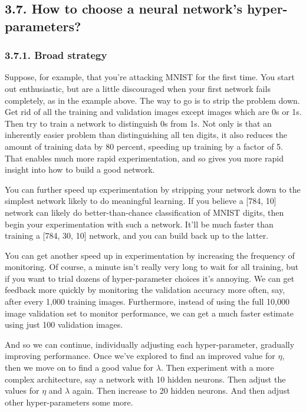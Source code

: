 \documentclass[12 pt]{article}
\begin{document}
\subsection{3.7. How to choose a neural network's hyper-parameters?}
\label{how-to-choose-a-neural-networks-hyper-parameters}

\subsubsection{3.7.1. Broad strategy}\label{broad-strategy}

Suppose, for example, that you're attacking MNIST for the first time.
You start out enthusiastic, but are a little discouraged when your first
network fails completely, as in the example above. The way to go is to
strip the problem down. Get rid of all the training and validation
images except images which are 0s or 1s. Then try to train a network to
distinguish 0s from 1s. Not only is that an inherently easier problem
than distinguishing all ten digits, it also reduces the amount of
training data by 80 percent, speeding up training by a factor of 5. That
enables much more rapid experimentation, and so gives you more rapid
insight into how to build a good network.

You can further speed up experimentation by stripping your network down
to the simplest network likely to do meaningful learning. If you believe
a {[}784, 10{]} network can likely do better-than-chance classification
of MNIST digits, then begin your experimentation with such a network.
It'll be much faster than training a {[}784, 30, 10{]} network, and you
can build back up to the latter.

You can get another speed up in experimentation by increasing the
frequency of monitoring. Of course, a minute isn't really very long to
wait for all training, but if you want to trial dozens of
hyper-parameter choices it's annoying. We can get feedback more quickly
by monitoring the validation accuracy more often, say, after every 1,000
training images. Furthermore, instead of using the full 10,000 image
validation set to monitor performance, we can get a much faster estimate
using just 100 validation images.

And so we can continue, individually adjusting each hyper-parameter,
gradually improving performance. Once we've explored to find an improved
value for $ \eta $, then we move on to find a good value for $
\lambda $. Then experiment with a more complex architecture, say a network
with 10 hidden neurons. Then adjust the values for
$ \eta $ and $ \lambda $ again. Then increase to 20 hidden neurons. And
then adjust other hyper-parameters some more.
\end{document}
